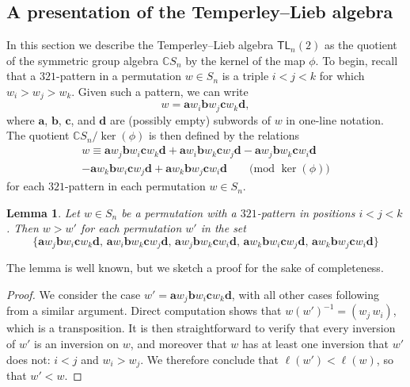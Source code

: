 \documentclass[12pt]{amsart}
\newtheorem{lem}[equation]{Lemma}
\theoremstyle{definition}
\theoremstyle{remark}
\numberwithin{equation}{section}
\newcommand{\CC}{\mathbb{C}}
\newcommand{\TL}{\mathsf{TL}}
\begin{document}
\subsection{A presentation of the Temperley--Lieb algebra}
\label{sec:TLpres}

In this section we describe the Temperley--Lieb algebra $\TL_{n}(2)$ as the quotient of the symmetric group algebra $\CC S_{n}$ by the kernel of the map $\phi$.  
To begin, recall that a $321$-pattern in a permutation $w \in S_{n}$ is a triple $i < j < k$ for which $w_{i} > w_{j} > w_{k}$.  Given such a pattern, we can write
\[
w = \mathbf{a}w_{i}\mathbf{b}w_{j}\mathbf{c}w_{k}\mathbf{d},
\]
where $\mathbf{a}$, $\mathbf{b}$, $\mathbf{c}$, and $\mathbf{d}$ are (possibly empty) subwords of $w$ in one-line notation.  The quotient $\CC S_{n} \big/ \ker(\phi)$ is then defined by the relations
\begin{multline}
\label{eq:321relation}
w \equiv \mathbf{a}w_{j}\mathbf{b}w_{i}\mathbf{c}w_{k}\mathbf{d} + \mathbf{a}w_{i}\mathbf{b}w_{k}\mathbf{c}w_{j}\mathbf{d} - \mathbf{a}w_{j}\mathbf{b}w_{k}\mathbf{c}w_{i}\mathbf{d} \\
- \mathbf{a}w_{k}\mathbf{b}w_{i}\mathbf{c}w_{j}\mathbf{d} + \mathbf{a}w_{k}\mathbf{b}w_{j}\mathbf{c}w_{i}\mathbf{d}  \qquad \text{(mod $\ker(\phi)$)}
\end{multline}
for each $321$-pattern in each permutation $w \in S_{n}$.

\begin{lem}
\label{lem:321reducebruhat}
Let $w \in S_{n}$ be a permutation with a $321$-pattern in positions $i < j < k$.  Then $w > w'$ for each permutation $w'$ in the set
\[
\{
\mathbf{a}w_{j}\mathbf{b}w_{i}\mathbf{c}w_{k}\mathbf{d},  \,
\mathbf{a}w_{i}\mathbf{b}w_{k}\mathbf{c}w_{j}\mathbf{d}, \,
\mathbf{a}w_{j}\mathbf{b}w_{k}\mathbf{c}w_{i}\mathbf{d}, \,
\mathbf{a}w_{k}\mathbf{b}w_{i}\mathbf{c}w_{j}\mathbf{d}, \,
\mathbf{a}w_{k}\mathbf{b}w_{j}\mathbf{c}w_{i}\mathbf{d}
\}
\]
\end{lem}

The lemma is well known, but we sketch a proof for the sake of completeness.

\begin{proof}
We consider the case $w'=\mathbf{a}w_{j}\mathbf{b}w_{i}\mathbf{c}w_{k}\mathbf{d}$, with all other cases following from a similar argument.  
Direct computation shows that $w(w')^{-1}= (w_j\,w_i)$, which is a transposition. 
It is then straightforward to verify that every inversion of $w'$ is an inversion on $w$, and moreover that $w$ has at least one inversion that $w'$ does not: $i < j$ and $w_{i} > w_{j}$.  We therefore conclude that $\ell(w')<\ell(w)$, so that $w' < w$.  
\end{proof}
\end{document}
